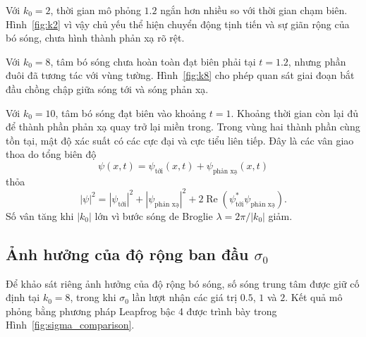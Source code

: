 \documentclass[12pt,a4paper]{article}
\begin{document}
Với $k_0=2$, thời gian mô phỏng $1.2$ ngắn hơn nhiều so với thời gian chạm biên. Hình~\ref{fig:k2} vì vậy chủ yếu thể hiện chuyển động tịnh tiến và sự giãn rộng của bó sóng, chưa hình thành phản xạ rõ rệt.

Với $k_0=8$, tâm bó sóng chưa hoàn toàn đạt biên phải tại $t=1.2$, nhưng phần đuôi đã tương tác với vùng tường. Hình~\ref{fig:k8} cho phép quan sát giai đoạn bắt đầu chồng chập giữa sóng tới và sóng phản xạ.

Với $k_0=10$, tâm bó sóng đạt biên vào khoảng $t=1$. Khoảng thời gian còn lại đủ để thành phần phản xạ quay trở lại miền trong. Trong vùng hai thành phần cùng tồn tại, mật độ xác suất có các cực đại và cực tiểu liên tiếp. Đây là các vân giao thoa do tổng biên độ
\begin{equation}
    \psi(x,t)=\psi_{\text{tới}}(x,t)+\psi_{\text{phản xạ}}(x,t)
\end{equation}
thỏa
\begin{equation}
    |\psi|^2=|\psi_{\text{tới}}|^2+|\psi_{\text{phản xạ}}|^2
    +2\operatorname{Re}\!\left(\psi_{\text{tới}}^*\psi_{\text{phản xạ}}\right).
\end{equation}
Số vân tăng khi $|k_0|$ lớn vì bước sóng de Broglie $\lambda=2\pi/|k_0|$ giảm.

\subsection{Ảnh hưởng của độ rộng ban đầu $\sigma_0$}

Để khảo sát riêng ảnh hưởng của độ rộng bó sóng, số sóng trung tâm được giữ cố định tại
$k_0=8$, trong khi $\sigma_0$ lần lượt nhận các giá trị $0.5$, $1$ và $2$.
Kết quả mô phỏng bằng phương pháp Leapfrog bậc 4 được trình bày trong
Hình~\ref{fig:sigma_comparison}.
\end{document}
